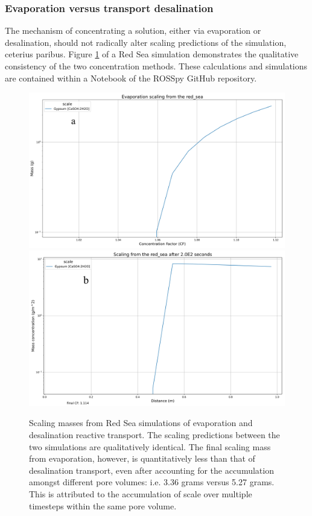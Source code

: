 \begin{supplementary}
\subsubsection{Evaporation versus transport desalination}

The mechanism of concentrating a solution, either via evaporation or desalination, should not radically alter scaling predictions of the simulation, ceterius paribus. Figure \ref{evaporation} of a Red Sea simulation demonstrates the qualitative consistency of the two concentration methods. These calculations and simulations are contained within a Notebook of the ROSSpy GitHub repository.

\begin{figure}[h!]
    \centering
    \includegraphics[width=\linewidth]{images/ROSSpy/sensitivity_analyses/evaporation/evaporation.png} \\ 
    \includegraphics[width=\linewidth]{images/ROSSpy/sensitivity_analyses/evaporation/desalination.png}
    \caption{
        Scaling masses from Red Sea simulations of evaporation and desalination reactive transport. The scaling predictions between the two simulations are qualitatively identical. The final scaling mass from evaporation, however, is quantitatively less than that of desalination transport, even after accounting for the accumulation amongst different pore volumes: i.e.  3.36 grams versus 5.27 grams. This is attributed to the accumulation of scale over multiple timesteps within the same pore volume. 
    }
    \label{evaporation}
\end{figure}



\end{supplementary}
